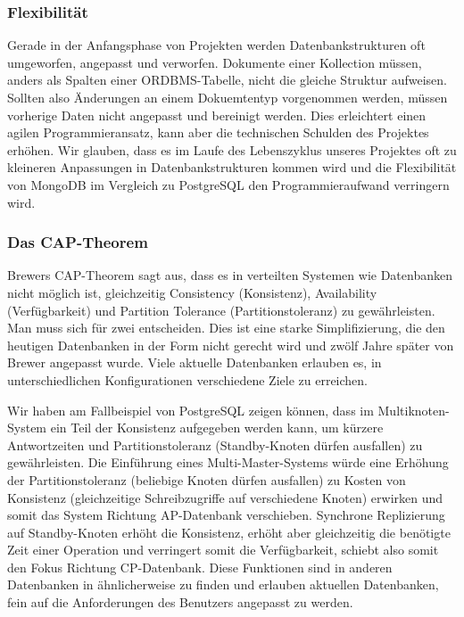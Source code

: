 \subsubsection{Flexibilität}
Gerade in der Anfangsphase von Projekten werden Datenbankstrukturen oft umgeworfen, angepasst und verworfen. Dokumente einer Kollection müssen, anders als Spalten einer ORDBMS-Tabelle, nicht die gleiche Struktur aufweisen. Sollten also Änderungen an einem Dokuemtentyp vorgenommen werden, müssen vorherige Daten nicht angepasst und bereinigt werden. Dies erleichtert einen agilen Programmieransatz, kann aber die technischen Schulden des Projektes erhöhen. Wir glauben, dass es im Laufe des Lebenszyklus unseres Projektes oft zu kleineren Anpassungen in Datenbankstrukturen kommen wird und die Flexibilität von MongoDB im Vergleich zu PostgreSQL den Programmieraufwand verringern wird.

\subsubsection{Das CAP-Theorem}
Brewers CAP-Theorem sagt aus, dass es in verteilten Systemen wie Datenbanken nicht möglich ist, gleichzeitig Consistency (Konsistenz), Availability (Verfügbarkeit) und Partition Tolerance (Partitionstoleranz) zu gewährleisten. Man muss sich für zwei entscheiden. %
Dies ist eine starke Simplifizierung, die den heutigen Datenbanken in der Form nicht gerecht wird und zwölf Jahre später von Brewer angepasst wurde. 
Viele aktuelle Datenbanken erlauben es, in unterschiedlichen Konfigurationen verschiedene Ziele zu erreichen. 
  
Wir haben am Fallbeispiel von PostgreSQL zeigen können, dass im Multiknoten-System ein Teil der Konsistenz aufgegeben werden kann, um kürzere Antwortzeiten und Partitionstoleranz (Standby-Knoten dürfen ausfallen) zu gewährleisten. Die Einführung eines Multi-Master-Systems würde eine Erhöhung der Partitionstoleranz (beliebige Knoten dürfen ausfallen) zu Kosten von Konsistenz (gleichzeitige Schreibzugriffe auf verschiedene Knoten) erwirken und somit das System Richtung AP-Datenbank verschieben. Synchrone Replizierung auf Standby-Knoten erhöht die Konsistenz, erhöht aber gleichzeitig die benötigte Zeit einer Operation und verringert somit die Verfügbarkeit, schiebt also somit den Fokus Richtung CP-Datenbank. Diese Funktionen sind in anderen Datenbanken in ähnlicherweise zu finden und erlauben aktuellen Datenbanken, fein auf die Anforderungen des Benutzers angepasst zu werden.


